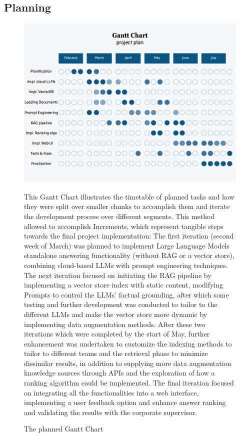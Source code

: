 \subsection{Planning}
\begin{figure}[H]
    \centering
    \includegraphics[width=\linewidth]{./figures/gantt-chart-1.png}
    \caption{The planned Gantt Chart}
    \begin{flushleft}
        \par This Gantt Chart illustrates the timetable of planned tasks and how they were split over smaller chunks to accomplish them and iterate the development process over different segments. This method allowed to accomplish Increments, which represent tangible steps towards the final project implementation: The first iteration (second week of March) was planned to implement Large Language Models standalone answering functionality (without RAG or a vector store), combining cloud-based LLMs with prompt engineering techniques. The next iteration focused on initiating the RAG pipeline by implementing a vector store index with static content, modifying Prompts to control the LLMs' factual grounding, after which some testing and further development was conducted to tailor to the different LLMs and make the vector store more dynamic by implementing data augmentation methods. After these two iterations which were completed by the start of May, further enhancement was undertaken to customize the indexing methods to tailor to different teams and the retrieval phase to minimize dissimilar results, in addition to supplying more data augmentation knowledge sources through APIs and the exploration of how a ranking algorithm could be implemented. The final iteration focused on integrating all the functionalities into a web interface, implementing a user feedback option and enhance answer ranking and validating the results with the corporate supervisor.
    \end{flushleft}
\end{figure}

